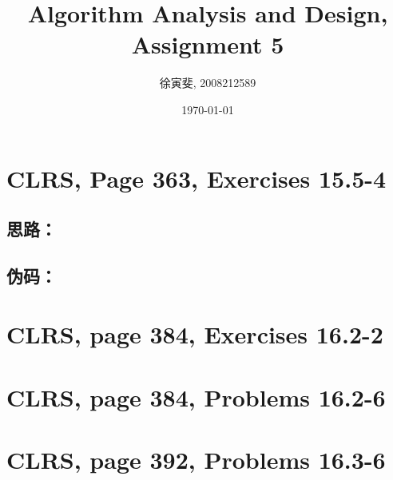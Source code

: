 \documentclass{article}
\begin{document}
\begin{CJK}{UTF8}{gbsn}
\title{Algorithm Analysis and Design, Assignment 5}
\author{徐寅斐, 2008212589}
\date{\today}
\maketitle

\section{CLRS, Page 363, Exercises 15.5-4}

\subsection*{思路：}

\subsection*{伪码：}

\begin{codebox}
\end{codebox}

\section{CLRS, page 384, Exercises 16.2-2}

\section{CLRS, page 384, Problems 16.2-6}

\section{CLRS, page 392, Problems 16.3-6}

\end{CJK}
\end{document}
